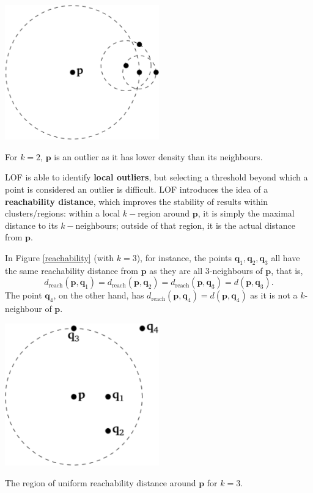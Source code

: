 \documentclass[20pt,landscape,footrule,headrule]{foils}
\newcommand{\newl}{\newline\newline}
\begin{document}
\begin{center}\includegraphics[width=0.5\textwidth]{Images/Figure11}
\end{center}
{For $k=2$, $\mathbf{p}$ is an outlier as it has lower density than its neighbours.}

\noindent LOF is able to identify \textbf{local outliers}, but selecting a threshold beyond which a point is considered an outlier is difficult. \newl LOF introduces the idea of a \textbf{reachability distance}, which improves the stability of results within clusters/regions: within a local $k-$region around $\mathbf{p}$, it is simply the maximal distance to its $k-$neighbours; outside of that region, it is the actual distance from $\mathbf{p}$. 
\par In Figure \ref{reachability} (with $k=3$), for instance, the points $\mathbf{q}_1, \mathbf{q}_2, \mathbf{q}_3$ all have the same reachability distance from $\mathbf{p}$ as they are all $3$-neighbours of $\mathbf{p}$, that is, 
$$
d_{\text{reach}}(\mathbf{p}, \mathbf{q}_1) 
= d_{\text{reach}}(\mathbf{p}, \mathbf{q}_2)
= d_{\text{reach}}(\mathbf{p}, \mathbf{q}_3)
= d(\mathbf{p}, \mathbf{q}_3)
.$$
The point $\mathbf{q}_4$, on the other hand, has 
$d_{\text{reach}}(\mathbf{p}, \mathbf{q}_4)
= d(\mathbf{p}, \mathbf{q}_4)
$
as it is not a $k$-neighbour of $\mathbf{p}$.

\begin{center}\includegraphics[width=0.5\textwidth]{Images/Figure12}
\end{center}
{The region of uniform reachability distance around $\mathbf{p}$ for $k=3$.}
\end{document}
